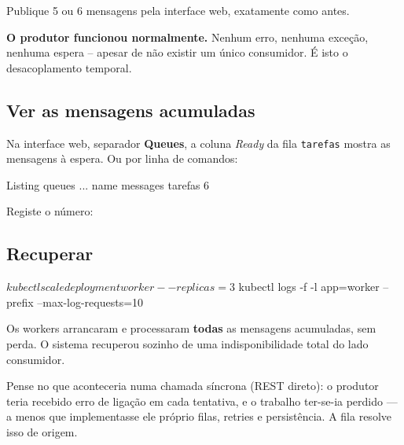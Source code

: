 \documentclass[11pt,a4paper]{article}
\begin{document}
Publique 5 ou 6 mensagens pela interface web, exatamente como antes.

\begin{verificar}
\textbf{O produtor funcionou normalmente.} Nenhum erro, nenhuma exceção, nenhuma espera -- apesar de não existir um único consumidor. É isto o desacoplamento temporal.
\end{verificar}

\subsection{Ver as mensagens acumuladas}

Na interface web, separador \textbf{Queues}, a coluna \emph{Ready} da fila \texttt{tarefas} mostra as mensagens à espera. Ou por linha de comandos:


\begin{saida}
Listing queues ...
name       messages
tarefas    6
\end{saida}

Registe o número: \underline{\hspace{1.5cm}}

\subsection{Recuperar}

\begin{terminal}
$ kubectl scale deployment worker --replicas=3
$ kubectl logs -f -l app=worker --prefix --max-log-requests=10
\end{terminal}

\begin{verificar}
Os workers arrancaram e processaram \textbf{todas} as mensagens acumuladas, sem perda. O sistema recuperou sozinho de uma indisponibilidade total do lado consumidor.
\end{verificar}

\begin{nota}
Pense no que aconteceria numa chamada síncrona (REST direto): o produtor teria recebido erro de ligação em cada tentativa, e o trabalho ter-se-ia perdido — a menos que implementasse ele próprio filas, retries e persistência. A fila resolve isso de origem.
\end{nota}
\end{document}
